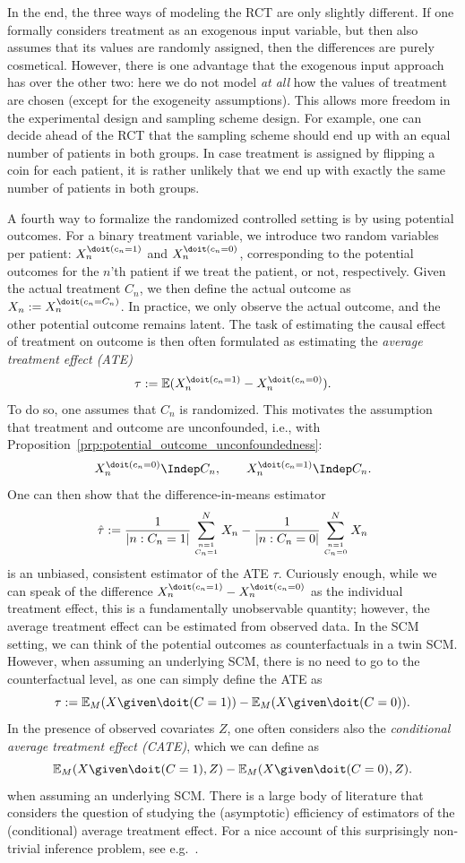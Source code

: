 In the end, the three ways of modeling the RCT are only slightly different. If one
formally considers treatment as an exogenous input variable, but then also assumes
that its values are randomly assigned, then the differences are purely cosmetical.
However, there is one advantage that the exogenous input approach has over the other
two: here we do not model \emph{at all} how the values of treatment are chosen
(except for the exogeneity assumptions). This allows more freedom in the experimental
design and sampling scheme design. For example, one can decide ahead of the RCT that 
the sampling scheme should end up with an equal number of patients in both groups. 
In case treatment is assigned by flipping a coin for each patient, it is rather unlikely
that we end up with exactly the same number of patients in both groups. 

A fourth way to formalize the randomized controlled setting is by using potential outcomes.
For a binary treatment variable, we introduce two random variables per patient:
$X^{\doit(c_n=1)}_n$ and $X^{\doit(c_n=0)}_n$, corresponding to the potential outcomes for
the $n$'th patient if we treat the patient, or not, respectively. 
Given the actual treatment $C_n$, we then define the actual outcome as 
$X_n := X_n^{\doit(c_n=C_n)}$. In practice, we only observe the actual outcome, and the
other potential outcome remains latent. The task of estimating the causal effect of
treatment on outcome is then often formulated as estimating the
\emph{average treatment effect (ATE)}
$$\tau := \Exp(X_n^{\doit(c_n=1)} - X_n^{\doit(c_n=0)}).$$
To do so, one assumes that $C_n$ is randomized. This motivates the assumption
that treatment and outcome are unconfounded, i.e., with Proposition~\ref{prp:potential_outcome_unconfoundedness}:
$$X_n^{\doit(c_n=0)} \Indep C_n, \qquad X_n^{\doit(c_n=1)} \Indep C_n.$$
One can then show that the difference-in-means estimator 
$$\hat{\tau} := \frac{1}{|n : C_n=1|} \sum_{n=1 \atop C_n=1}^N X_n - \frac{1}{|n : C_n=0|} \sum_{n=1 \atop C_n=0}^N X_n$$
is an unbiased, consistent estimator of the ATE $\tau$.
Curiously enough, while we can speak of the difference
$X_n^{\doit(c_n=1)} - X_n^{\doit(c_n=0)}$ as the individual treatment effect,
this is a fundamentally unobservable quantity; however, the average treatment effect can 
be estimated from observed data. In the SCM setting, we can think of the potential
outcomes as counterfactuals in a twin SCM. However, when assuming an underlying SCM,
there is no need to go to the counterfactual level, as one can simply define the
ATE as
$$\tau := \Exp_{M}(X \given \doit(C=1)) - \Exp_{M}(X \given \doit(C=0)).$$
In the presence of observed covariates $Z$, one often considers also the \emph{conditional
average treatment effect (CATE)}, which we can define as
$$\Exp_{M}(X \given \doit(C=1),Z) - \Exp_{M}(X \given \doit(C=0),Z).$$
when assuming an underlying SCM. There is a large body of literature that considers the
question of studying the (asymptotic) efficiency of estimators of the (conditional)
average treatment effect. For a nice account of this surprisingly non-trivial inference problem, 
see e.g.\ \cite{Wager2020}.

